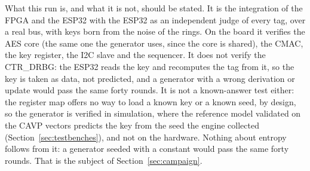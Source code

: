 What this run is, and what it is not, should be stated. It is the
integration of the \ac{FPGA} and the ESP32 with the ESP32 as an
independent judge of every tag, over a real bus, with keys born from the
noise of the rings. On the board it verifies the \ac{AES} core (the same
one the generator uses, since the core is shared), the \ac{CMAC}, the key
register, the \ac{I2C} slave and the sequencer. It does not verify the
CTR\_DRBG: the ESP32 reads the key and recomputes the tag from it, so the
key is taken as data, not predicted, and a generator with a wrong
derivation or update would pass the same forty rounds. It is not a
known-answer test either: the register map offers no way to load a
known key or a known seed, by design, so the generator is verified in
simulation, where the reference model validated on the \ac{CAVP} vectors
predicts the key from the seed the engine collected
(Section~\ref{sec:testbenches}), and not on the hardware. Nothing about
entropy follows from it: a generator seeded with a constant would pass
the same forty rounds. That is the subject of
Section~\ref{sec:campaign}.
